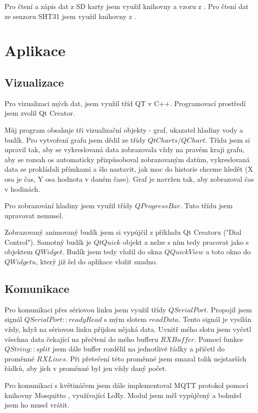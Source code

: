 \documentclass[11pt,a4paper]{article}
\begin{document}
	Pro čtení a zápis dat z SD karty jsem využil knihovny a vzoru z \cite{bib:sdcard}. Pro čtení dat ze senzoru SHT31 jsem využil knihovny z \cite{bib:sht}.
	
	\section{Aplikace}
	\subsection{Vizualizace}
	Pro vizualizaci mých dat, jsem využil tříd QT v C++. Programovací prostředí jsem zvolil Qt Creator. 
	
	Můj program obsahuje tři vizualizační objekty - graf, ukazatel hladiny vody a budík. Pro vytvoření grafu jsem dědil ze třídy $QtCharts/QChart$. Třídu jsem si upravil tak, aby se vykreslovaná data zobrazovala vždy na pravém kraji grafu, aby se rozsah os automaticky přizpůsoboval zobrazovaným datům, vykreslovaná data se prokládali přímkami a šlo nastavit, jak moc do historie chceme hledět (X osa je čas, Y osa hodnota v daném čase). Graf je navržen tak, aby zobrazoval čas v hodinách. 
	
	Pro zobrazování hladiny jsem využil třídy $QProgressBar$. Tuto třídu jsem upravovat nemusel.
	
	Zobrazovaný animovaný budík jsem si vypůjčil z příkladu Qt Creatoru ("Dial Control")\cite{bib:dial}. Samotný budík je $QtQuick$ objekt a nelze s ním tedy pracovat jako s objektem $QWidget$. Budík jsem tedy vložil do okna $QQuickView$ a toto okno do $QWidgetu$, který již šel do aplikace vložit snadno.
	\subsection{Komunikace}
	Pro komunikaci přes sériovou linku jsem využil třídy $QSerialPort$. Propojil jsem signál $QSerialPort::readyRead$ s mým slotem $readData$. Tento signál je vysílán vždy, když na sériovou linku přijdou nějaká data. Uvnitř mého slotu jsem vyčetl všechna data čekající na přečtení do mého bufferu $RXBuffer$. Pomocí funkce $QString::split$ jsem dále buffer rozdělil na jednotlivé řádky a přičetl do proměnné $RXLines$. Při přetečení této proměnné jsem smazal tolik nejstarších řádků, aby jich v proměnné byl jen vždy daný počet. 
	
	Pro komunikaci s květináčem jsem dále implementoval MQTT protokol pomocí knihovny Mosquitto \cite{bib:mosqq}, využívající LoRy. Modul jsem měl vypůjčený a bohužel jsem ho musel vrátit.
	
\end{document}
